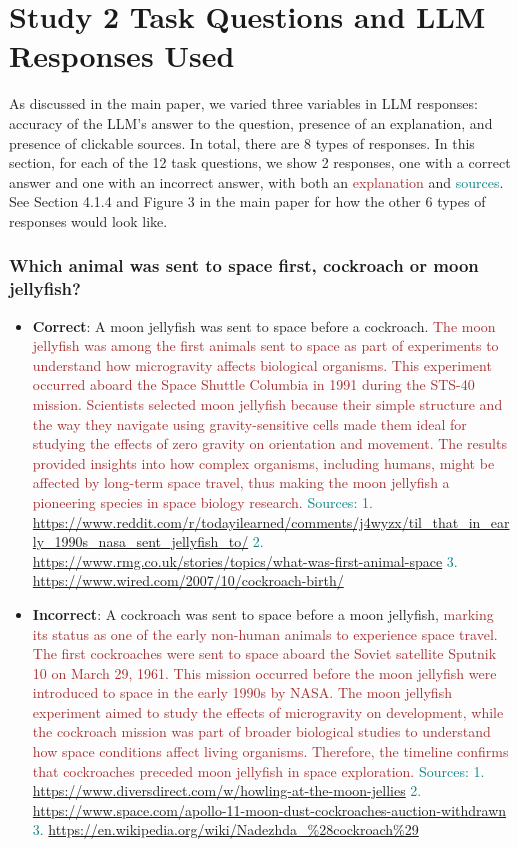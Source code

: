 \section{Study 2 Task Questions and LLM Responses Used}
\label{app:study2stimuli}

As discussed in the main paper, we varied three variables in LLM responses: accuracy of the LLM's answer to the question, presence of an explanation, and presence of clickable sources. In total, there are 8 types of responses. In this section, for each of the 12 task questions, we show 2 responses, one with a correct answer and one with an incorrect answer, with both an \textcolor{brown}{explanation} and \textcolor{teal}{sources}. See Section 4.1.4 and Figure 3 in the main paper for how the other 6 types of responses would look like.


\subsubsection*{Which animal was sent to space first, cockroach or moon jellyfish?}
\begin{itemize}[leftmargin=*]
    \item \textbf{Correct}: A moon jellyfish was sent to space before a cockroach. \textcolor{brown}{The moon jellyfish was among the first animals sent to space as part of experiments to understand how microgravity affects biological organisms. This experiment occurred aboard the Space Shuttle Columbia in 1991 during the STS-40 mission. Scientists selected moon jellyfish because their simple structure and the way they navigate using gravity-sensitive cells made them ideal for studying the effects of zero gravity on orientation and movement. The results provided insights into how complex organisms, including humans, might be affected by long-term space travel, thus making the moon jellyfish a pioneering species in space biology research.} \textcolor{teal}{Sources: 1. \url{https://www.reddit.com/r/todayilearned/comments/j4wyzx/til_that_in_early_1990s_nasa_sent_jellyfish_to/} 2. \url{https://www.rmg.co.uk/stories/topics/what-was-first-animal-space} 3. \url{https://www.wired.com/2007/10/cockroach-birth/}}
    \item \textbf{Incorrect}: A cockroach was sent to space before a moon jellyfish, \textcolor{brown}{marking its status as one of the early non-human animals to experience space travel. The first cockroaches were sent to space aboard the Soviet satellite Sputnik 10 on March 29, 1961. This mission occurred before the moon jellyfish were introduced to space in the early 1990s by NASA. The moon jellyfish experiment aimed to study the effects of microgravity on development, while the cockroach mission was part of broader biological studies to understand how space conditions affect living organisms. Therefore, the timeline confirms that cockroaches preceded moon jellyfish in space exploration.} \textcolor{teal}{Sources: 1. \url{https://www.diversdirect.com/w/howling-at-the-moon-jellies} 2. \url{https://www.space.com/apollo-11-moon-dust-cockroaches-auction-withdrawn} 3. \url{https://en.wikipedia.org/wiki/Nadezhda_\%28cockroach\%29}}
\end{itemize}

